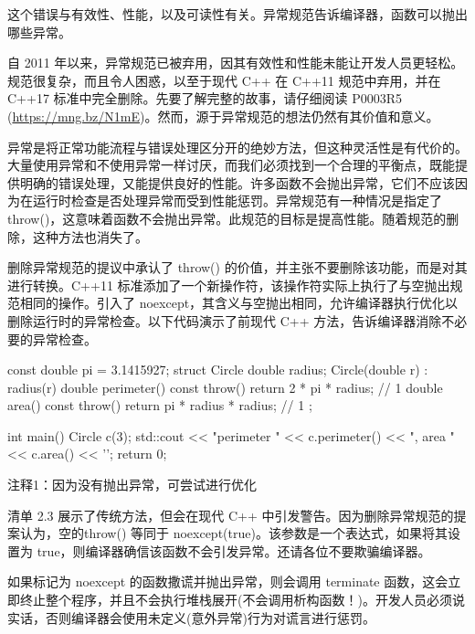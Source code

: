 
这个错误与有效性、性能，以及可读性有关。异常规范告诉编译器，函数可以抛出哪些异常。


自 2011 年以来，异常规范已被弃用，因其有效性和性能未能让开发人员更轻松。规范很复杂，而且令人困惑，以至于现代 C++ 在 C++11 规范中弃用，并在 C++17 标准中完全删除。先要了解完整的故事，请仔细阅读 P0003R5 (\url{https://mng.bz/N1mE})。然而，源于异常规范的想法仍然有其价值和意义。

异常是将正常功能流程与错误处理区分开的绝妙方法，但这种灵活性是有代价的。大量使用异常和不使用异常一样讨厌，而我们必须找到一个合理的平衡点，既能提供明确的错误处理，又能提供良好的性能。许多函数不会抛出异常，它们不应该因为在运行时检查是否处理异常而受到性能惩罚。异常规范有一种情况是指定了 throw()，这意味着函数不会抛出异常。此规范的目标是提高性能。随着规范的删除，这种方法也消失了。

删除异常规范的提议中承认了 throw() 的价值，并主张不要删除该功能，而是对其进行转换。C++11 标准添加了一个新操作符，该操作符实际上执行了与空抛出规范相同的操作。引入了 noexcept，其含义与空抛出相同，允许编译器执行优化以删除运行时的异常检查。以下代码演示了前现代 C++ 方法，告诉编译器消除不必要的异常检查。


\begin{cpp}
const double pi = 3.1415927;
struct Circle {
  double radius;
  Circle(double r) : radius(r) {}
  double perimeter() const throw() { return 2 * pi * radius; } // 1
  double area() const throw() { return pi * radius * radius; } // 1
};

int main() {
  Circle c(3);
  std::cout << "perimeter " << c.perimeter() << ", area " << c.area() << '\n';
  return 0;
}
\end{cpp}

{\footnotesize
注释1：因为没有抛出异常，可尝试进行优化
}


清单 2.3 展示了传统方法，但会在现代 C++ 中引发警告。因为删除异常规范的提案认为，空的throw() 等同于 noexcept(true)。该参数是一个表达式，如果将其设置为 true，则编译器确信该函数不会引发异常。还请各位不要欺骗编译器。

如果标记为 noexcept 的函数撒谎并抛出异常，则会调用 terminate 函数，这会立即终止整个程序，并且不会执行堆栈展开(不会调用析构函数！)。开发人员必须说实话，否则编译器会使用未定义(意外异常)行为对谎言进行惩罚。


